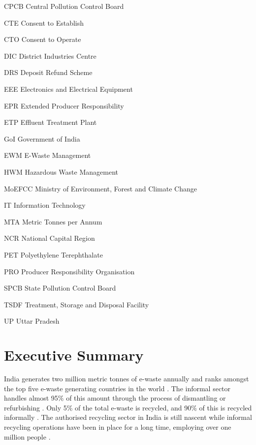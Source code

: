 \documentclass[a4paper, 12pt]{article}
\begin{document}
\begin{abbrv}
         
        \item[CPCB]			Central Pollution Control Board
        \item[CTE]				Consent to Establish
        \item[CTO]			Consent to Operate
        \item[DIC]				District Industries Centre
        \item[DRS]			Deposit Refund Scheme
        \item[EEE]				Electronics and Electrical Equipment 
        \item[EPR]				Extended Producer Responsibility
        \item[ETP]				Effluent Treatment Plant 
        \item[GoI]				Government of India
        \item[EWM]			E-Waste Management
        \item[HWM]			Hazardous Waste Management
        \item[MoEFCC]			Ministry of Environment, Forest and Climate Change
        \item[IT]				Information Technology 
        \item[MTA]				Metric Tonnes per Annum
        \item[NCR]			National Capital Region
        \item[PET]				Polyethylene Terephthalate
        \item[PRO]			Producer Responsibility Organisation
        \item[SPCB]			State Pollution Control Board
        \item[TSDF]			Treatment, Storage and Disposal Facility
        \item[UP]				Uttar Pradesh
        
        
         
\end{abbrv}
        
                    
\newpage
\section*{Executive Summary}
                    
                    India generates two million metric tonnes of e-waste annually and ranks amongst the top five e-waste generating countries in the world \parencite{shenoynews}. The informal sector handles almost 95\% of this amount through the process of dismantling or refurbishing \parencite{assochamstats}. Only 5\% of the total e-waste is recycled, and 90\% of this is recycled informally \parencite{assochamstats, kumarnews}. The authorised recycling sector in India is still nascent while informal recycling operations have been in place for a long time, employing over one million people \parencite{baldereport}. \\
                    
\end{document}
